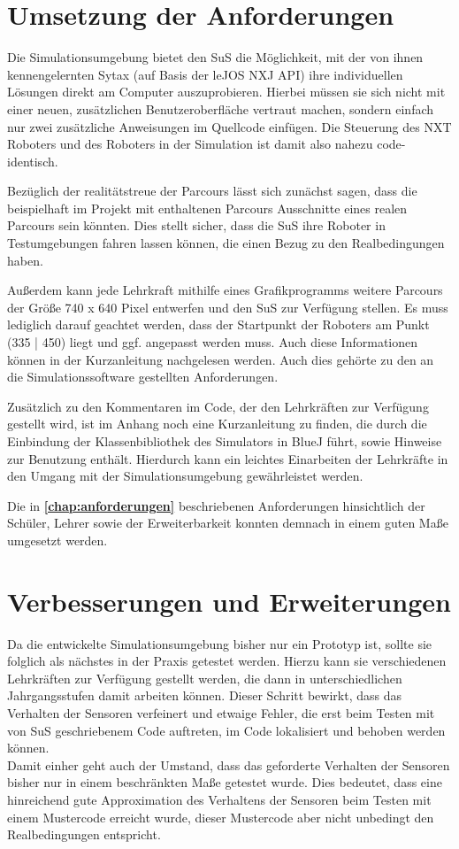 \documentclass[paper=a4, pagesize, DIV=calc, BCOR=15mm, twoside=on, onecolumn=on, open = right, titlepage =on, parskip =half-, headsepline = on, footsepline = on, chapterprefix = on, appendixprefix = off, fontsize = 12pt, numbers = noenddot, abstract = on]{scrbook}
\numberwithin{equation}{chapter}
\theoremstyle{definition}
\theoremstyle{plain}
\theoremstyle{plain}
\theoremstyle{remark}
\theoremstyle{plain}
\theoremstyle{plain}
\begin{document}
\section{Umsetzung der Anforderungen}

Die Simulationsumgebung bietet den SuS die Möglichkeit, mit der von ihnen kennengelernten Sytax (auf Basis der leJOS NXJ API) ihre individuellen Lösungen direkt am Computer auszuprobieren. Hierbei müssen sie sich nicht mit einer neuen, zusätzlichen Benutzeroberfläche vertraut machen, sondern einfach nur zwei zusätzliche Anweisungen im Quellcode einfügen. Die Steuerung des NXT Roboters und des Roboters in der Simulation ist damit also nahezu code-identisch.

Bezüglich der realitätstreue der Parcours lässt sich zunächst sagen, dass die beispielhaft im Projekt mit enthaltenen Parcours Ausschnitte eines realen Parcours sein könnten. Dies stellt sicher, dass die SuS ihre Roboter in Testumgebungen fahren lassen können, die einen Bezug zu den Realbedingungen haben.

Außerdem kann jede Lehrkraft mithilfe eines Grafikprogramms weitere Parcours der Größe 740 x 640 Pixel entwerfen und den SuS zur Verfügung stellen. Es muss lediglich darauf geachtet werden, dass der Startpunkt der Roboters am Punkt (335 | 450) liegt und ggf. angepasst werden muss. Auch diese Informationen können in der Kurzanleitung nachgelesen werden. Auch dies gehörte zu den an die Simulationssoftware gestellten Anforderungen.

Zusätzlich zu den Kommentaren im Code, der den Lehrkräften zur Verfügung gestellt wird, ist im Anhang noch eine Kurzanleitung zu finden, die durch die Einbindung der Klassenbibliothek des Simulators in BlueJ führt, sowie Hinweise zur Benutzung enthält. Hierdurch kann ein leichtes Einarbeiten der Lehrkräfte in den Umgang mit der Simulationsumgebung gewährleistet werden. 

Die in \textbf{\ref{chap:anforderungen}} beschriebenen Anforderungen hinsichtlich der Schüler, Lehrer sowie der Erweiterbarkeit konnten demnach in einem guten Maße umgesetzt werden.

\section{Verbesserungen und Erweiterungen}

Da die entwickelte Simulationsumgebung bisher nur ein Prototyp ist, sollte sie folglich als nächstes in der Praxis getestet werden. Hierzu kann sie verschiedenen Lehrkräften zur Verfügung gestellt werden, die dann in unterschiedlichen Jahrgangsstufen damit arbeiten können. Dieser Schritt bewirkt, dass das Verhalten der Sensoren verfeinert und etwaige Fehler, die erst beim Testen mit von SuS geschriebenem Code auftreten, im Code lokalisiert und behoben werden können.\\
Damit einher geht auch der Umstand, dass das geforderte Verhalten der Sensoren bisher nur in einem beschränkten Maße getestet wurde. Dies bedeutet, dass eine hinreichend gute Approximation des Verhaltens der Sensoren beim Testen mit einem Mustercode erreicht wurde, dieser Mustercode aber nicht unbedingt den Realbedingungen entspricht. 
\end{document}
